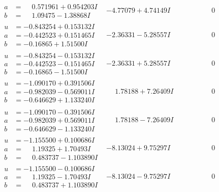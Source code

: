 \documentclass[1p]{elsarticle_modified}
\theoremstyle{definition}
\begin{document}
$$\begin{array}{c|c|c}
\begin{aligned}
a &= \phantom{-}0.571961 + 0.954203 I \\
b &= \phantom{-}1.09475 - 1.38868 I\end{aligned}
 & -4.77079 + 4.74149 I & \phantom{-0.000000 } 0 \\ \hline\begin{aligned}
u &= -0.843254 + 0.153132 I \\
a &= -0.442523 + 0.151465 I \\
b &= -0.16865 + 1.51500 I\end{aligned}
 & -2.36331 - 5.28557 I & \phantom{-0.000000 } 0 \\ \hline\begin{aligned}
u &= -0.843254 - 0.153132 I \\
a &= -0.442523 - 0.151465 I \\
b &= -0.16865 - 1.51500 I\end{aligned}
 & -2.36331 + 5.28557 I & \phantom{-0.000000 } 0 \\ \hline\begin{aligned}
u &= -1.090170 + 0.391506 I \\
a &= -0.982039 - 0.569011 I \\
b &= -0.646629 + 1.133240 I\end{aligned}
 & \phantom{-}1.78188 + 7.26409 I & \phantom{-0.000000 } 0 \\ \hline\begin{aligned}
u &= -1.090170 - 0.391506 I \\
a &= -0.982039 + 0.569011 I \\
b &= -0.646629 - 1.133240 I\end{aligned}
 & \phantom{-}1.78188 - 7.26409 I & \phantom{-0.000000 } 0 \\ \hline\begin{aligned}
u &= -1.155500 + 0.100686 I \\
a &= \phantom{-}1.19325 + 1.70493 I \\
b &= \phantom{-}0.483737 - 1.103890 I\end{aligned}
 & -8.13024 + 9.75297 I & \phantom{-0.000000 } 0 \\ \hline\begin{aligned}
u &= -1.155500 - 0.100686 I \\
a &= \phantom{-}1.19325 - 1.70493 I \\
b &= \phantom{-}0.483737 + 1.103890 I\end{aligned}
 & -8.13024 - 9.75297 I & \phantom{-0.000000 } 0 \\ \hline\begin{aligned}

\end{aligned}
\end{array}$$
\end{document}
